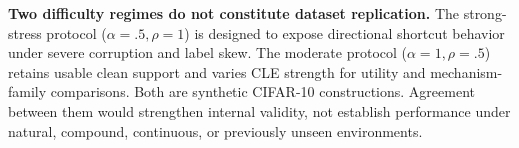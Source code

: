 \textbf{Two difficulty regimes do not constitute dataset replication.}
The strong-stress protocol ($\alpha=.5,\rho=1$) is designed to expose directional shortcut behavior under severe corruption and label skew. The moderate protocol ($\alpha=1,\rho=.5$) retains usable clean support and varies CLE strength for utility and mechanism-family comparisons. Both are synthetic CIFAR-10 constructions. Agreement between them would strengthen internal validity, not establish performance under natural, compound, continuous, or previously unseen environments.

\ifdraftskeleton
{}
\fi
